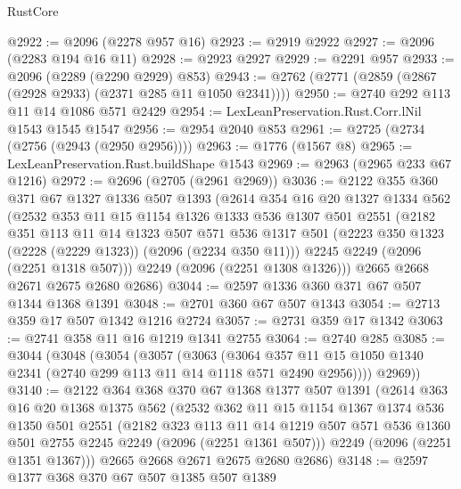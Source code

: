 \begin{lexlean}{RustCore}
\begin{coremodule}
@2922 := @2096 (@2278 @957 @16)
@2923 := @2919 @2922
@2927 := @2096 (@2283 @194 @16 @11)
@2928 := @2923 @2927
@2929 := @2291 @957
@2933 := @2096 (@2289 (@2290 @2929) @853)
@2943 := @2762 (@2771 (@2859 (@2867 (@2928 @2933) (@2371 @285 @11 @1050 @2341))))
@2950 := @2740 @292 @113 @11 @14 @1086 @571 @2429
@2954 := LexLeanPreservation.Rust.Corr.lNil @1543 @1545 @1547
@2956 := @2954 @2040 @853
@2961 := @2725 (@2734 (@2756 (@2943 (@2950 @2956))))
@2963 := @1776 (@1567 @8)
@2965 := LexLeanPreservation.Rust.buildShape @1543
@2969 := @2963 (@2965 @233 @67 @1216)
@2972 := @2696 (@2705 (@2961 @2969))
@3036 := @2122
    @355
    @360
    @371
    @67
    @1327
    @1336
    @507
    @1393
    (@2614
      @354
      @16
      @20
      @1327
      @1334
      @562
      (@2532
        @353
        @11
        @15
        @1154
        @1326
        @1333
        @536
        @1307
        @501
        @2551
        (@2182
          @351
          @113
          @11
          @14
          @1323
          @507
          @571
          @536
          @1317
          @501
          (@2223 @350 @1323 (@2228 (@2229 @1323)) (@2096 (@2234 @350 @11)))
          @2245
          @2249
          (@2096 (@2251 @1318 @507)))
        @2249
        (@2096 (@2251 @1308 @1326)))
      @2665
      @2668
      @2671
      @2675
      @2680
      @2686)
@3044 := @2597 @1336 @360 @371 @67 @507 @1344 @1368 @1391
@3048 := @2701 @360 @67 @507 @1343
@3054 := @2713 @359 @17 @507 @1342 @1216 @2724
@3057 := @2731 @359 @17 @1342
@3063 := @2741 @358 @11 @16 @1219 @1341 @2755
@3064 := @2740 @285
@3085 := @3044
    (@3048
      (@3054
        (@3057
          (@3063
            (@3064
              @357
              @11
              @15
              @1050
              @1340
              @2341
              (@2740 @299 @113 @11 @14 @1118 @571 @2490 @2956))))
        @2969))
@3140 := @2122
    @364
    @368
    @370
    @67
    @1368
    @1377
    @507
    @1391
    (@2614
      @363
      @16
      @20
      @1368
      @1375
      @562
      (@2532
        @362
        @11
        @15
        @1154
        @1367
        @1374
        @536
        @1350
        @501
        @2551
        (@2182
          @323
          @113
          @11
          @14
          @1219
          @507
          @571
          @536
          @1360
          @501
          @2755
          @2245
          @2249
          (@2096 (@2251 @1361 @507)))
        @2249
        (@2096 (@2251 @1351 @1367)))
      @2665
      @2668
      @2671
      @2675
      @2680
      @2686)
@3148 := @2597 @1377 @368 @370 @67 @507 @1385 @507 @1389

\end{coremodule}
\end{lexlean}
